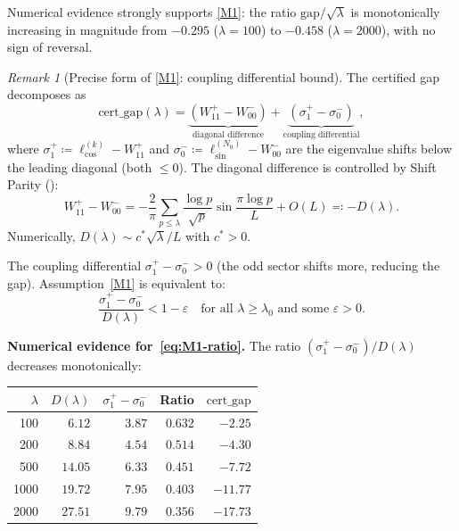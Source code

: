 \documentclass[12pt,a4paper]{article}
\theoremstyle{definition}
\theoremstyle{remark}
\newtheorem{remark}[theorem]{Remark}
\begin{document}
Numerical evidence strongly supports \ref{M1}: the ratio $\mathrm{gap}/\sqrt{\lambda}$ is monotonically increasing in magnitude from $-0.295$ ($\lambda = 100$) to $-0.458$ ($\lambda = 2000$), with no sign of reversal.

\begin{remark}[Precise form of \ref{M1}: coupling differential bound]
\label{rem:M1-precise}
The certified gap decomposes as
\begin{equation}
\label{eq:gap-decomp}
  \mathrm{cert\_gap}(\lambda) = \underbrace{(W_{11}^+ - W_{00}^-)}_{\text{diagonal difference}} + \underbrace{(\sigma^+_1 - \sigma^-_0)}_{\text{coupling differential}},
\end{equation}
where $\sigma^+_1 \coloneqq \ell_{\cos}^{(k)} - W_{11}^+$ and $\sigma^-_0 \coloneqq \ell_{\sin}^{(N_0)} - W_{00}^-$ are the eigenvalue shifts below the leading diagonal (both $\leq 0$). The diagonal difference is controlled by Shift Parity ():
\[
  W_{11}^+ - W_{00}^- = -\frac{2}{\pi}\sum_{p \leq \lambda}\frac{\log p}{\sqrt{p}}\sin\frac{\pi\log p}{L} + O(L) \eqqcolon -D(\lambda).
\]
Numerically, $D(\lambda) \sim c^*\sqrt{\lambda}/L$ with $c^* > 0$.

The coupling differential $\sigma^+_1 - \sigma^-_0 > 0$ (the odd sector shifts more, reducing the gap). Assumption~\ref{M1} is equivalent to:
\begin{equation}
\label{eq:M1-ratio}
  \frac{\sigma^+_1 - \sigma^-_0}{D(\lambda)} < 1 - \varepsilon \quad\text{for all } \lambda \geq \lambda_0 \text{ and some } \varepsilon > 0.
\end{equation}
\end{remark}

\noindent\textbf{Numerical evidence for~\eqref{eq:M1-ratio}.} The ratio $(\sigma^+_1 - \sigma^-_0)/D(\lambda)$ decreases monotonically:

\begin{center}
\small
\renewcommand{\arraystretch}{1.15}
\begin{tabular}{r|r|r|r|r}
$\lambda$ & $D(\lambda)$ & $\sigma_1^+\! -\! \sigma_0^-$ & Ratio & $\mathrm{cert\_gap}$ \\\hline
100  & $6.12$  & $3.87$ & $0.632$ & $-2.25$ \\
200  & $8.84$  & $4.54$ & $0.514$ & $-4.30$ \\
500  & $14.05$ & $6.33$ & $0.451$ & $-7.72$ \\
1000 & $19.72$ & $7.95$ & $0.403$ & $-11.77$ \\
2000 & $27.51$ & $9.79$ & $0.356$ & $-17.73$
\end{tabular}
\end{center}
\end{document}

